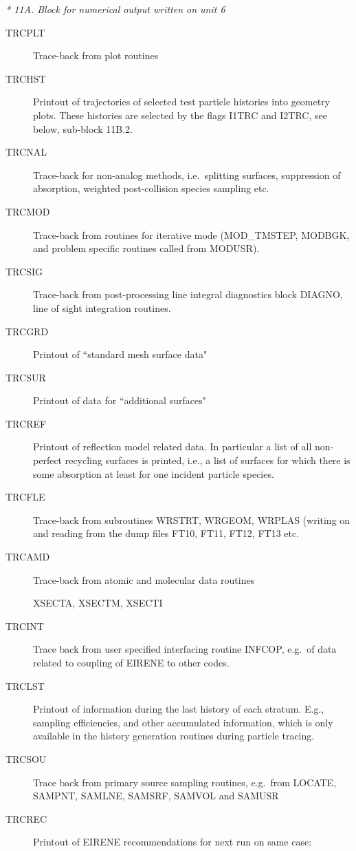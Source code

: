 \textsl{* 11A.
  Block for numerical output written on unit 6}
\begin{description}
  \item[TRCPLT]
        Trace-back from plot routines
  \item[TRCHST] Printout of trajectories of
        selected test particle histories into geometry plots.
        These histories are selected by the flags I1TRC and I2TRC, see below, sub-block
        11B.2.
  \item[TRCNAL] Trace-back for non-analog methods, i.e.\ splitting surfaces,
        suppression of absorption, weighted post-collision species sampling etc.
  \item[TRCMOD] Trace-back from routines for iterative mode (MOD\_TMSTEP, MODBGK,
        and problem specific routines called from MODUSR).
  \item[TRCSIG] Trace-back from post-processing line integral diagnostics block
        DIAGNO, line of sight integration routines.
  \item[TRCGRD] Printout of ``standard mesh surface data"
  \item[TRCSUR] Printout
        of data for ``additional surfaces"
  \item[TRCREF] Printout of reflection model
        related data.
        In particular a list of all non-perfect recycling surfaces is printed, i.e., a
        list of surfaces for which there is some absorption at least for one incident
        particle species.
  \item[TRCFLE] Trace-back from subroutines WRSTRT, WRGEOM, WRPLAS (writing on
        and reading from the dump files FT10, FT11, FT12, FT13 etc.
  \item[TRCAMD]
        Trace-back from atomic and molecular data routines 

        XSECTA, XSECTM, XSECTI
  \item[TRCINT] Trace back from user specified interfacing
        routine INFCOP, e.g.\ of data related to coupling of EIRENE to other codes.
  \item[TRCLST] Printout of information during the last history of each stratum.
        E.g., sampling efficiencies, and other accumulated information, which is only
        available in the history generation routines during particle tracing.
  \item[TRCSOU] Trace back from primary source sampling routines, e.g.\ from
        LOCATE, SAMPNT, SAMLNE, SAMSRF, SAMVOL and SAMUSR
  \item[TRCREC] Printout of
        EIRENE recommendations for next run on same case:


\end{description}
